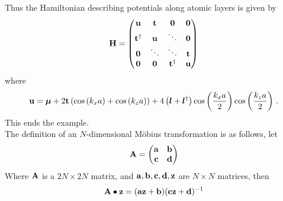 \documentclass[a4paper, 12pt]{article}
\begin{document}
	Thus the Hamiltonian describing potentials along atomic layers is given by
	\begin{equation}
	\bf	H = \begin{pmatrix} \bf u&\bf t& \bf 0&\bf 0\\\bf t^\dagger&\bf u &\ddots&\bf 0\\\bf 0&\ddots&\ddots&\bf t\\\bf 0&\bf 0&\bf t^\dagger&\bf u\end{pmatrix}
	\end{equation}
	where 
	\begin{equation}
		{\bf u} = \bm \mu + 2{\bf t}\left(\cos\left(k_x a\right)+\cos\left(k_z a\right)\right) + 4\left(\bm l + \bm l^\dagger\right)\cos\left(\frac{k_xa}{2}\right)\cos\left(\frac{k_za}{2}\right)\,.
	\end{equation}
	This ends the example.
	\\[2mm] The definition of an $N$-dimensional M\"{o}bius transformation is as follows, let
\begin{equation}
\bf{A} = \begin{pmatrix} \bf{a}&\bf{b}\\ \bf{c}&\bf{d} \end{pmatrix}
\end{equation}
Where $\bf{A}$ is a $2N \times 2N$ matrix, and $\bf{a}, \bf{b}, \bf{c}, \bf{d}, \bf{z}$ are $N \times N$ matrices, then
\begin{equation}\label{LHMT}
\bf{A \bullet z} = (\bf{az} + \bf{b})(\bf{cz} + \bf{d})^{\rm -1}
\end{equation}
\end{document}
